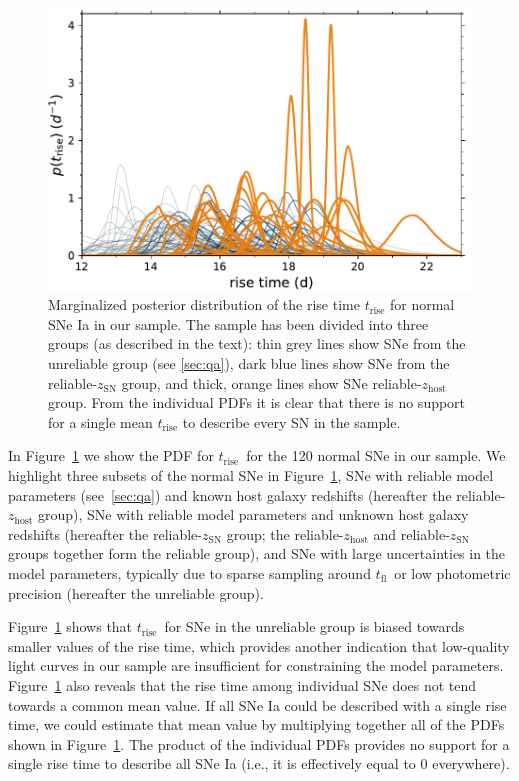 \documentclass[twocolumn]{./aastex63}
\newcommand{\tfl}{$t_\mathrm{fl}$}
\newcommand{\trise}{$t_\mathrm{rise}$}
\begin{document}
\begin{figure}
    \centering
    \includegraphics[width=1\linewidth]{./figures/rise_time.pdf}
    \caption{Marginalized posterior distribution of the rise time
    $t_\mathrm{rise}$ for normal SNe Ia in our sample. The sample has been
    divided into three groups (as described in the text): thin grey lines show
    SNe from the unreliable group (see \ref{sec:qa}), dark blue lines show
    SNe from the reliable-$z_\mathrm{SN}$ group, and thick, orange lines show
    SNe reliable-$z_\mathrm{host}$ group. From the individual PDFs it is
    clear that there is no support for a single mean $t_\mathrm{rise}$ to
    describe every SN in the sample.}
    \label{fig:rise_time}
\end{figure}

In Figure~\ref{fig:rise_time} we show the PDF for \trise\ for the 120 normal
SNe in our sample. We highlight three subsets of the normal SNe in
Figure~\ref{fig:rise_time}, SNe with reliable model parameters
(see~\ref{sec:qa}) and known host galaxy redshifts (hereafter the
reliable-$z_\mathrm{host}$ group), SNe with reliable model parameters and
unknown host galaxy redshifts (hereafter the reliable-$z_\mathrm{SN}$ group;
the reliable-$z_\mathrm{host}$ and reliable-$z_\mathrm{SN}$ groups together
form the reliable group), and SNe with large uncertainties in the model
parameters, typically due to sparse sampling around \tfl\ or low photometric
precision (hereafter the unreliable group).

Figure~\ref{fig:rise_time} shows that \trise\ for SNe in the unreliable group
is biased towards smaller values of the rise time, which provides another
indication that low-quality light curves in our sample are insufficient for
constraining the model parameters. Figure~\ref{fig:rise_time} also reveals
that the rise time among individual SNe does not tend towards a common mean
value. If all SNe Ia could be described with a single rise time, we could
estimate that mean value by multiplying together all of the PDFs shown in
Figure~\ref{fig:rise_time}. The product of the individual PDFs provides no
support for a single rise time to describe all SNe Ia (i.e., it is effectively
equal to 0 everywhere).
\end{document}
